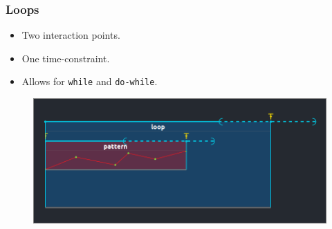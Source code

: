 \documentclass{beamer}
\begin{document}
\begin{frame}
    \frametitle{Loops}  
    \Large
    \begin{itemize}
        \item Two interaction points.
        \item One time-constraint.
        \item Allows for \texttt{while} and \texttt{do-while}.
    \end{itemize}
    
    \begin{figure}
        \includegraphics[width=\textwidth]{images/loop.png}
    \end{figure}
\end{frame}
\end{document}
